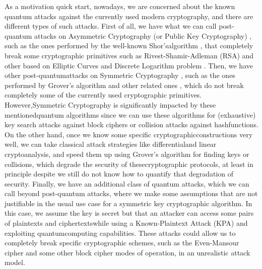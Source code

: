 \documentclass[12pt]{article}
\begin{document}
    As a motivation quick start, nowadays, we are concerned about the known quantum attacks against the currently used modern cryptography, and there are different types of such attacks. First of all, we have what we can call post-quantum attacks on Asymmetric Cryptography (or Public Key Cryptography) \cite{merkle:secure-communications-over-insecure-channels:1975:03-2024,diffie-hellman:new-directions-cryptography:1976:03-2024}, such as the ones performed by the well-known Shor's\break algorithm \cite{shor:algorithms-quantum-computation-discrete-logarithms-factoring:1994:03-2024,shor:polynomial-time-algorithms-prime-factorization-discrete-logarithms-quantum-computer:1997:03-2024}, that completely break some cryptographic primitives such as Rivest-Shamir-Adleman (RSA)\cite{rivest-shamir-adleman:method-obtaining-digital-signatures-public-key-cryptosystems:1978:03-2024} and other based on Elliptic Curves \cite{miller:use-elliptic-curves-cryptography:1986:03-2024,koblitz:elliptic-curve-cryptosystems:1987:03-2024}\break and Discrete Logarithm problem \cite{elgamal:public-key-cryptosystem-signature-scheme-based-discrete-logarithms:1985:03-2024}. Then, we have other post-quantum\break attacks on Symmetric Cryptography \cite{rijmen-daemen:advanced-encryption-standard:2001:02-2024}, such as the ones performed by Grover's algorithm \cite{grover:fast-quantum-mechanical-algorithms-database-search:1996:03-2024} and other related ones \cite{simon:power-quantum-computation:1997:03-2024,brassard-hoyer-tapp:quantum-cryptanalysis-hash-claw-free-functions-1998:03-2024}, which do not break completely some of the currently used cryptographic primitives. However,\break Symmetric Cryptography is significantly impacted by these mentioned\break quantum algorithms since we can use these algorithms for (exhaustive) key search attacks against block ciphers or collision attacks against hash\break functions. On the other hand, once we know some specific cryptographic\break constructions very well, we can take classical attack strategies like differential\break and linear cryptoanalysis, and speed them up using Grover's algorithm\break \cite{kaplan-leurent-leverrier-naya-plasencia:quantum-differential-linear-cryptanalysis:2016:03-2024} for finding keys or collisions, which degrade the security of these\break cryptographic protocols, at least in principle despite we still do not know how to quantify that degradation of security. Finally, we have an additional class of quantum attacks, which we can call beyond post-quantum attacks, where we make some assumptions that are not justifiable in the usual use case for a symmetric key cryptographic algorithm. In this case, we assume the key is secret but that an attacker can access some pairs of plaintexts and ciphertexts\break while using a Known-Plaintext Attack (KPA) and exploiting quantum\break computing capabilities. These attacks could allow us to completely break specific cryptographic schemes, such as the Even-Mansour cipher \cite{even-mansour:construction-cipher-single-pseudorandom-permutation:1997:03-2024,dunkelman-keller-shamir:minimalism-cryptography-even-mansour-scheme-revisited:2012:03-2024} and some other block cipher modes of operation, in an unrealistic attack model.
\end{document}
